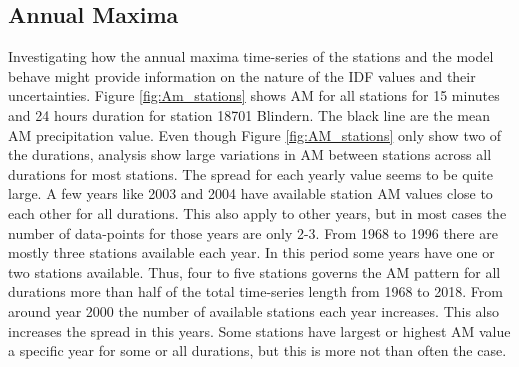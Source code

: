 \subsection{Annual Maxima}

Investigating how the annual maxima time-series of the stations and the model behave might provide information on the nature of the IDF values and their uncertainties. Figure \ref{fig:Am_stations} shows AM for all stations for 15 minutes and 24 hours duration for station 18701 Blindern. The black line are the mean AM precipitation value. Even though Figure \ref{fig:AM_stations} only show two of the durations, analysis show large variations in AM between stations across all durations for most stations. The spread for each yearly value seems to be quite large. A few years like 2003 and 2004 have available station AM values close to each other for all durations. This also apply to other years, but in most cases the number of data-points for those years are only 2-3. From 1968 to 1996 there are mostly three stations available each year. In this period some years have one or two stations available. Thus, four to five stations governs the AM pattern for all durations more than half of the total time-series length from 1968 to 2018. From around year 2000 the number of available stations each year increases. This also increases the spread in this years. Some stations have largest or highest AM value a specific year for some or all durations, but this is more not than often the case.      

